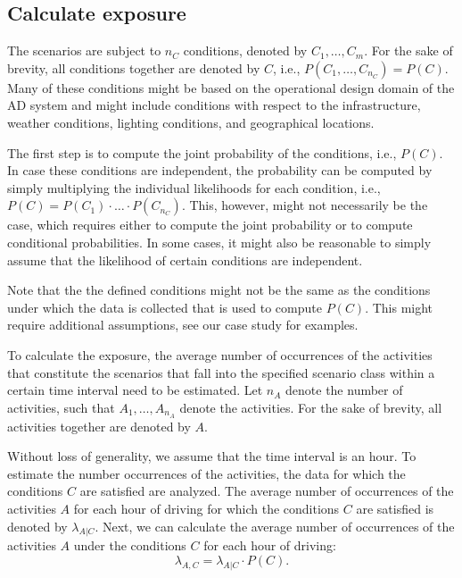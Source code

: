 \subsection{Calculate exposure}

The scenarios are subject to $n_C$ conditions, denoted by $C_1, \ldots, C_m$. For the sake of brevity, all conditions together are denoted by $C$, i.e., $P(C_1, \ldots, C_{n_C})=P(C)$. Many of these conditions might be based on the operational design domain of the AD system and might include conditions with respect to the infrastructure, weather conditions, lighting conditions, and geographical locations. 

The first step is to compute the joint probability of the conditions, i.e., $P(C)$. In case these conditions are independent, the probability can be computed by simply multiplying the individual likelihoods for each condition, i.e., $P(C)=P(C_1)\cdot\ldots\cdot P(C_{n_C})$. This, however, might not necessarily be the case, which requires either to compute the joint probability or to compute conditional probabilities. In some cases, it might also be reasonable to simply assume that the likelihood of certain conditions are independent.

Note that the the defined conditions might not be the same as the conditions under which the data is collected that is used to compute $P(C)$. This might require additional assumptions, see our case study for examples.

To calculate the exposure, the average number of occurrences of the activities that constitute the scenarios that fall into the specified scenario class within a certain time interval need to be estimated. Let $n_A$ denote the number of activities, such that $A_1, \ldots, A_{n_A}$ denote the activities. For the sake of brevity, all activities together are denoted by $A$. 

Without loss of generality, we assume that the time interval is an hour. To estimate the number occurrences of the activities, the data for which the conditions $C$ are satisfied are analyzed. The average number of occurrences of the activities $A$ for each hour of driving for which the conditions $C$ are satisfied is denoted by $\lambda_{A|C}$. Next, we can calculate the average number of occurrences of the activities $A$ under the conditions $C$ for each hour of driving:
\begin{equation}
	\lambda_{A,C} = \lambda_{A|C} \cdot P(C).
\end{equation}

